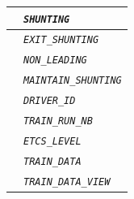 \begin{itemize}
\begin{longtable}{|l|l|}
				\hline

				&	\begin{minipage}[t]{0.78\linewidth} \emph{\texttt{SHUNTING}} \end{minipage} \\

				\hline

				&	\begin{minipage}[t]{0.78\linewidth} \emph{\texttt{EXIT\_SHUNTING}} \end{minipage} \\

				\hline

				&	\begin{minipage}[t]{0.78\linewidth} \emph{\texttt{NON\_LEADING}} \end{minipage} \\

				\hline

				&	\begin{minipage}[t]{0.78\linewidth} \emph{\texttt{MAINTAIN\_SHUNTING}} \end{minipage} \\

				\hline

				&	\begin{minipage}[t]{0.78\linewidth} \emph{\texttt{DRIVER\_ID}} \end{minipage} \\

				\hline

				&	\begin{minipage}[t]{0.78\linewidth} \emph{\texttt{TRAIN\_RUN\_NB}} \end{minipage} \\

				\hline

				&	\begin{minipage}[t]{0.78\linewidth} \emph{\texttt{ETCS\_LEVEL}} \end{minipage} \\

				\hline

				&	\begin{minipage}[t]{0.78\linewidth} \emph{\texttt{TRAIN\_DATA}} \end{minipage} \\

				\hline

				&	\begin{minipage}[t]{0.78\linewidth} \emph{\texttt{TRAIN\_DATA\_VIEW}} \end{minipage} \\


\end{longtable}
\end{itemize}
